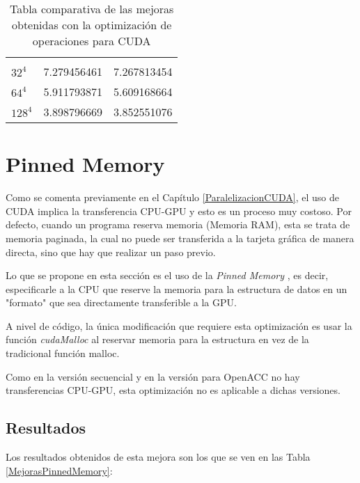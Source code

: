 \begin{table}[H]
\begin{tabular}{lll}
                 &                                                                                                &                                                                                  \\
    $32^4 $     & 7.279456461                                                                                    & 7.267813454                                                                      \\
    $64^4 $     & 5.911793871                                                                                    & 5.609168664                                                                      \\
    $128^4$     & 3.898796669                                                                                    & 3.852551076                                                                     
    \end{tabular}
    \caption{Tabla comparativa de las mejoras obtenidas con la optimización de operaciones para CUDA}
    \label{MejorasOptimizacionOperacionesCUDA}
    \end{table}

\section{Pinned Memory}

Como se comenta previamente en el Capítulo \ref{ParalelizacionCUDA}, el uso de CUDA implica la transferencia CPU-GPU y esto es un proceso muy costoso. Por defecto, cuando un programa reserva memoria (Memoria RAM), esta se trata de memoria paginada, la cual no puede ser transferida a la tarjeta gráfica de manera directa, sino que hay que realizar un paso previo. 

Lo que se propone en esta sección es el uso de la \textit{Pinned Memory} \cite{unknown-author-2020}, es decir, especificarle a la CPU que reserve la memoria para la estructura de datos en un "formato"  que sea directamente transferible a la GPU.

A nivel de código, la única modificación que requiere esta optimización es usar la función \textit{cudaMalloc} al reservar memoria para la estructura en vez de la tradicional función malloc. 

Como en la versión secuencial y en la versión para OpenACC no hay transferencias CPU-GPU, esta optimización no es aplicable a dichas versiones.

\subsection{Resultados}
Los resultados obtenidos de esta mejora son los que se ven en las Tabla \ref{MejorasPinnedMemory}: 


